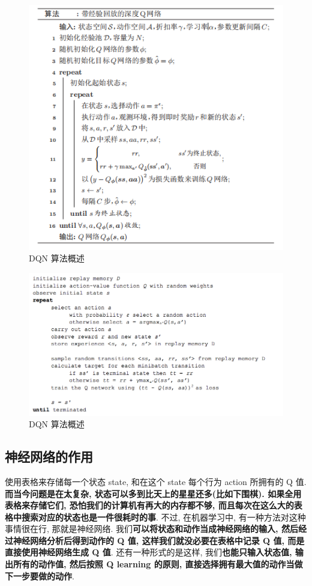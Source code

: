 \documentclass[UTF8,a4paper,12pt]{ctexbook}
\begin{document}
			\begin{figure}[H]
				\centering
				\includegraphics[width=.9\linewidth]{DQN6}
				\caption{DQN 算法概述}
			\end{figure}			
			\begin{figure}[H]
				\centering
				\includegraphics[width=.9\linewidth]{DQN5}
				\caption{DQN 算法概述}
			\end{figure}
		
		\subsection{神经网络的作用}
			使用表格来存储每一个状态 state, 和在这个 state 每个行为 action 所拥有的 Q 值. \textbf{而当今问题是在太复杂, 状态可以多到比天上的星星还多(比如下围棋). 如果全用表格来存储它们, 恐怕我们的计算机有再大的内存都不够, 而且每次在这么大的表格中搜索对应的状态也是一件很耗时的事}. 不过, 在机器学习中, 有一种方法对这种事情很在行, 那就是神经网络. 我们\textbf{可以将状态和动作当成神经网络的输入, 然后经过神经网络分析后得到动作的 Q 值, 这样我们就没必要在表格中记录 Q 值, 而是直接使用神经网络生成 Q 值}. 还有一种形式的是这样, 我们\textbf{也能只输入状态值, 输出所有的动作值, 然后按照 Q learning 的原则, 直接选择拥有最大值的动作当做下一步要做的动作}. 
			
\end{document}
